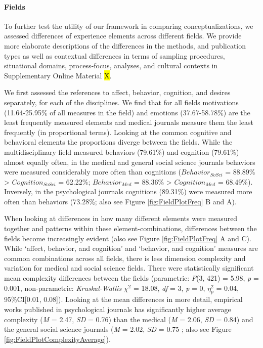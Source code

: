 \paragraph{Fields}

To further test the utility of our framework in comparing
conceptualizations, we assessed differences of experience elements
across different fields. We provide more elaborate descriptions of the
differences in the methods, and publication types as well as contextual
differences in terms of sampling procedures, situational domains,
process-focus, analyses, and cultural contexts in Supplementary Online
Material \hl{X}.

We first assessed the references to affect, behavior, cognition, and
desires separately, for each of the disciplines. We find that for all
fields motivations (11.64-25.95\% of all measures in the field) and
emotions (37.67-58.78\%) are the least frequently measured elements and
medical journals measure them the least frequently (in proportional
terms). Looking at the common cognitive and behavioral elements the
proportions diverge between the fields. While the multidisciplinary
field measured behaviors (79.61\%) and cognition (79.61\%) almost
equally often, in the medical and general social science journals
behaviors were measured considerably more often than cognitions
(\(Behavior_{SoSci}\) = 88.89\% \textgreater{} \(Cognition_{SoSci}\) =
62.22\%; \(Behavior_{Med}\) = 88.36\% \textgreater{} \(Cognition_{Med}\)
= 68.49\%). Inversely, in the psychological journals cognitions
(89.31\%) were measured more often than behaviors (73.28\%; also see
Figure \ref{fig:FieldPlotFreq} B and A).

When looking at differences in how many different elements were measured
together and patterns within these element-combinations, differences
between the fields become increasingly evident (also see Figure
\ref{fig:FieldPlotFreq} A and C). While `affect, behavior, and
cognition' and `behavior, and cognition' measures are common
combinations across all fields, there is less dimension complexity and
variation for medical and social science fields. There were
statistically significant mean complexity differences between the fields
(parametric: \textit{F}(3, 421) = 5.98, \textit{p} = 0.001,
non-parametric: \textit{Kruskal-Wallis} \(\chi^{2}\) = 18.08,
\textit{df} = 3, \textit{p} = 0, \(\eta_{p}^{2}\) = 0.04, 95\%CI{[}0.01,
0.08{]}). Looking at the mean differences in more detail, empirical
works published in psychological journals has significantly higher
average complexity (\textit{M} = 2.47, \textit{SD} = 0.76) than the
medical (\textit{M} = 2.06, \textit{SD} = 0.84) and the general social
science journals (\textit{M} = 2.02, \textit{SD} = 0.75 ; also see
Figure \ref{fig:FieldPlotComplexityAverage}).

